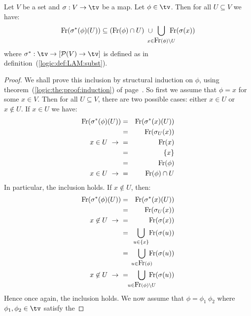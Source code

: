 \begin{prop}\label{logic:prop:LAM:freevar:of:betasubst:gen}
Let $V$ be a set and $\sigma:V\to\tv$ be a map. Let $\phi\in\tv$.
Then for all $U\subseteq V$ we have:
    \[
        \free(\sigma^{*}(\phi)(U)) 
            \subseteq 
        (\free(\phi)\cap U)
        \ \cup\ 
        \!\!\!\!\!\!\!\!
        \bigcup_{x\in\free(\phi)\setminus U}
        \!\!\!\!\!\!
        \free(\sigma(x))
    \]
where $\sigma^{*}:\tv\to[{\cal P}(V)\to\tv]$ is defined as in 
definition~(\ref{logic:def:LAM:subst}).
\end{prop}
\begin{proof}
We shall prove this inclusion by structural induction on $\phi$, using
theorem~(\ref{logic:the:proof:induction}) of 
page~\pageref{logic:the:proof:induction}. So first we assume that $\phi=x$ 
for some $x\in V$. Then for all $U\subseteq V$, there are two possible cases: 
either $x\in U$ or $x\not\in U$. If $x\in U$ we have:
    \begin{eqnarray*}
        \mbox{\rm Fr}(\sigma^{*}(\phi)(U))
        &=&\mbox{\rm Fr}(\sigma^{*}(x)(U))\\
        &=&\mbox{\rm Fr}(\sigma_{U}(x))\\
        \mbox{$x\in U\ \rightarrow\ $}&=&\mbox{\rm Fr}(x)\\
         &=&\{x\}\\
         &=&\mbox{\rm Fr}(\phi)\\
        \mbox{$x\in U\ \rightarrow\ $}&=&\mbox{\rm Fr}(\phi)\cap U
    \end{eqnarray*}
In particular, the inclusion holds. If $x\not\in U$, then:
     \begin{eqnarray*}
        \free(\sigma^{*}(\phi)(U))
        &=&\free(\sigma^{*}(x)(U))\\
        &=&\free(\sigma_{U}(x))\\
        \mbox{$x\not\in U\ \rightarrow\ $}&=&\free(\sigma(x))\\
        &=&
        \!\!\!
        \bigcup_{u\in\{x\}} 
        \!
        \free(\sigma(u))\\
        &=&
        \!\!\!\!\!
        \bigcup_{u\in\free(\phi)}
        \!\!\!\!
        \free(\sigma(u))\\
        \mbox{$x\not\in U\ \rightarrow\ $}
        &=&\!\!\!\!\!\!\!\!
        \bigcup_{u\in\free(\phi)\setminus U}
        \!\!\!\!\!\!\!
        \free(\sigma(u))
    \end{eqnarray*}
Hence once again, the inclusion holds. We now assume that 
$\phi=\phi_{1}\ \phi_{2}$ where $\phi_{1}, \phi_{2}\in\tv$ satisfy the 

\end{proof}
